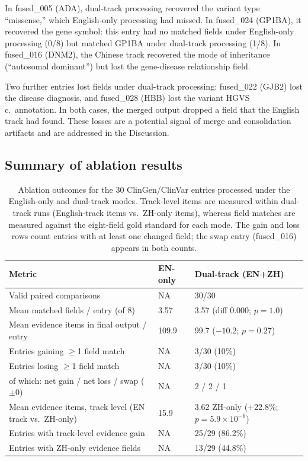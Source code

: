 \documentclass[preprint,12pt]{elsarticle}
\begin{document}
In fused\_005 (ADA), dual-track processing recovered the variant type
``missense,'' which English-only processing had missed. In fused\_024
(GP1BA), it recovered the gene symbol: this entry had no matched fields
under English-only processing (0/8) but matched GP1BA under dual-track
processing (1/8). In fused\_016 (DNM2), the Chinese track recovered the
mode of inheritance (``autosomal dominant'') but lost the gene-disease
relationship field.

Two further entries lost fields under dual-track processing:
fused\_022 (GJB2) lost the disease diagnosis, and fused\_028 (HBB) lost
the variant HGVS c.\ annotation. In
both cases, the merged output dropped a field that the English track had
found. These losses are a potential signal of merge and consolidation
artifacts and are addressed in the Discussion.

\subsection{Summary of ablation results}

\begin{table}[htbp]
  \centering
  \caption{Ablation outcomes for the 30 ClinGen/ClinVar entries processed
  under the English-only and dual-track modes. Track-level items are
  measured within dual-track runs (English-track items vs.\ ZH-only
  items), whereas field matches are measured against the eight-field gold
  standard for each mode. The gain and loss rows count entries with at
  least one changed field; the swap entry (fused\_016) appears in both
  counts.}
  \label{tab:summary}
  \small
  \begin{tabular}{@{}p{5.8cm}p{1.8cm}p{4.6cm}@{}}
    \toprule
    Metric & EN-only & Dual-track (EN+ZH) \\
    \midrule
    Valid paired comparisons & NA & 30/30 \\
    Mean matched fields / entry (of 8) & 3.57 & 3.57 (diff 0.000; $p = 1.0$) \\
    Mean evidence items in final output / entry & 109.9 & 99.7 ($-10.2$; $p = 0.27$) \\
    Entries gaining $\geq$1 field match & NA & 3/30 (10\%) \\
    Entries losing $\geq$1 field match & NA & 3/30 (10\%) \\
    \quad of which: net gain / net loss / swap ($\pm$0) & NA & 2 / 2 / 1 \\
    Mean evidence items, track level (EN track vs.\ ZH-only) & 15.9 & 3.62 ZH-only (+22.8\%; $p = 5.9 \times 10^{-6}$) \\
    Entries with track-level evidence gain & NA & 25/29 (86.2\%) \\
    Entries with ZH-only evidence fields & NA & 13/29 (44.8\%) \\
    \bottomrule
  \end{tabular}
\end{table}
\end{document}

